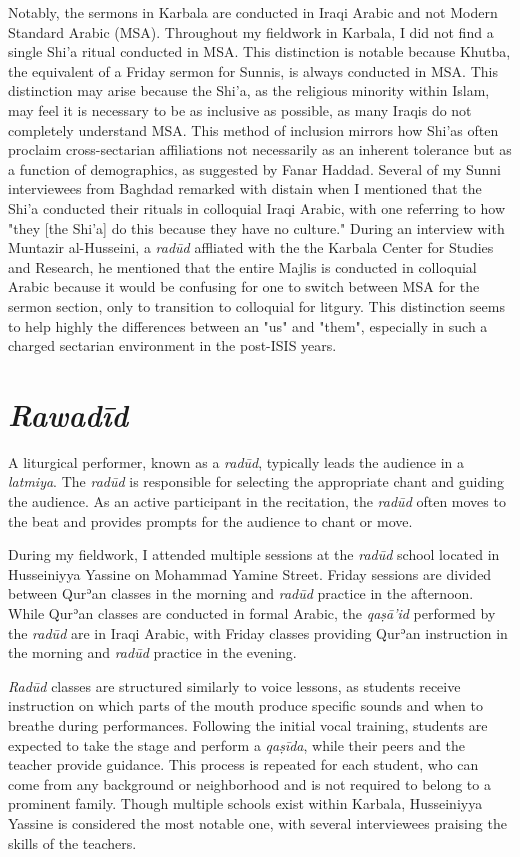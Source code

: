 Notably, the sermons in Karbala are conducted in Iraqi Arabic and not Modern Standard Arabic (MSA). Throughout my fieldwork in Karbala, I did not find a single Shi'a ritual conducted in MSA. This distinction is notable because Khutba, the equivalent of a Friday sermon for Sunnis, is always conducted in MSA. This distinction may arise because the Shi'a, as the religious minority within Islam, may feel it is necessary to be as inclusive as possible, as many Iraqis do not completely understand MSA. This method of inclusion mirrors how Shi'as often proclaim cross-sectarian affiliations not necessarily as an inherent tolerance but as a function of demographics, as suggested by Fanar Haddad\cite[183]{haddad_understanding_2020}. Several of my Sunni interviewees from Baghdad remarked with distain when I mentioned that the Shi'a conducted their rituals in colloquial Iraqi Arabic, with one referring to how "they [the Shi'a] do this because they have no culture." During an interview with Muntazir al-Husseini, a \emph{radūd} affliated with the the Karbala Center for Studies and Research, he mentioned that the entire Majlis is conducted in colloquial Arabic because it would be confusing for one to switch between MSA for the sermon section, only to transition to colloquial for litgury. This distinction seems to help highly the differences between an "us" and "them", especially in such a charged sectarian environment in the post-ISIS years. 

\section{\emph{Rawadīd}} \label{radood-section}
A liturgical performer, known as a \emph{radūd}, typically leads the audience in a \emph{latmiya}. The \emph{radūd} is responsible for selecting the appropriate chant and guiding the audience. As an active participant in the recitation, the \emph{radūd} often moves to the beat and provides prompts for the audience to chant or move.

During my fieldwork, I attended multiple sessions at the \emph{radūd} school located in Husseiniyya Yassine on Mohammad Yamine Street. Friday sessions are divided between Qurʾan classes in the morning and \emph{radūd} practice in the afternoon. While Qurʾan classes are conducted in formal Arabic, the \emph{qaṣā’id} performed by the \emph{radūd} are in Iraqi Arabic, with Friday classes providing Qurʾan instruction in the morning and \emph{radūd} practice in the evening.

\emph{Radūd} classes are structured similarly to voice lessons, as students receive instruction on which parts of the mouth produce specific sounds and when to breathe during performances. Following the initial vocal training, students are expected to take the stage and perform a \emph{qaṣīda}, while their peers and the teacher provide guidance. This process is repeated for each student, who can come from any background or neighborhood and is not required to belong to a prominent family. Though multiple schools exist within Karbala, Husseiniyya Yassine is considered the most notable one, with several interviewees praising the skills of the teachers.

